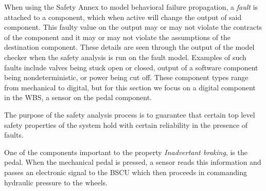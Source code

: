 When using the Safety Annex to model behavioral failure propagation, a \textit{fault} is attached to a component, which when active will change the output of said component. This faulty value on the output may or may not violate the contracts of the component and it may or may not violate the assumptions of the destination component. These details are seen through the output of the model checker when the safety analysis is run on the fault model. Examples of such faults include valves being stuck open or closed, output of a software component being nondeterministic, or power being cut off. These component types range from mechanical to digital, but for this section we focus on a digital component in the WBS, a sensor on the pedal component. 

The purpose of the safety analysis process is to guarantee that certain top level safety properties of the system hold with certain reliability in the presence of faults. 



One of the components important to the property \textit{Inadvertant braking}, is the pedal. When the mechanical pedal is pressed, a sensor reads this information and passes an electronic signal to the BSCU which then proceeds in commanding hydraulic pressure to the wheels. 

